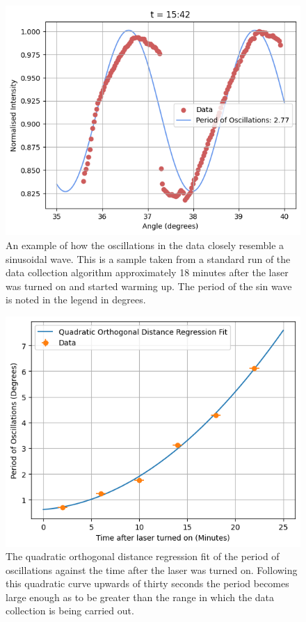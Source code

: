 \documentclass[%
reprint,
amsmath,amssymb,
aps,
]{revtex4-2}
\begin{document}
			\begin{figure}
				\includegraphics[width=0.85\columnwidth]{exampleTimeDependence.png}
				\caption{\label{fig:exampleSin}An example of how the oscillations in the data closely resemble a sinusoidal wave. This is a sample taken from a standard run of the data collection algorithm approximately 18 minutes after the laser was turned on and started warming up. The period of the sin wave is noted in the legend in degrees.}
			\end{figure}		
		
			\begin{figure}
				\includegraphics[width=0.85\columnwidth]{quadraticFit.png}
				\caption{\label{fig:quadraticDependence}The quadratic orthogonal distance regression fit of the period of oscillations against the time after the laser was turned on. Following this quadratic curve upwards of thirty seconds the period becomes large enough as to be greater than the range in which the data collection is being carried out.}
			\end{figure}
			
\end{document}
